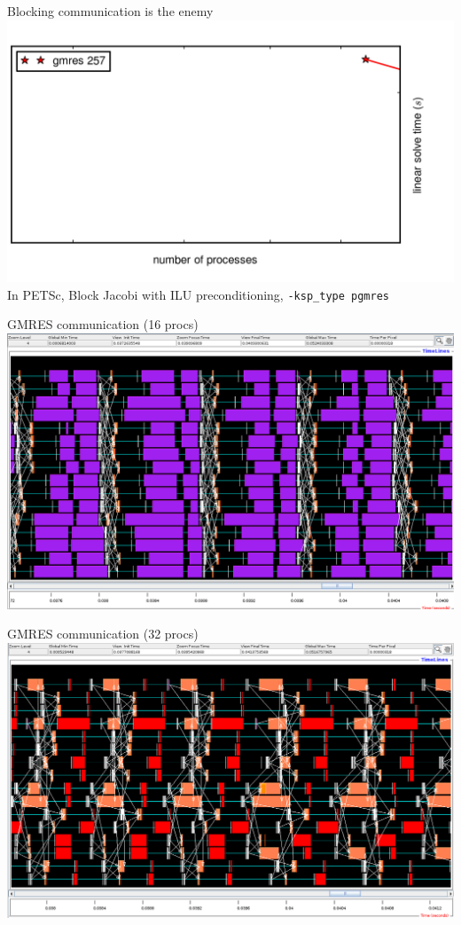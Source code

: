 \documentclass{beamer}
\begin{document}
\begin{frame}{Blocking communication is the enemy}
  \includegraphics{figures/PipelinedGMRES} \\
  In PETSc, Block Jacobi with ILU preconditioning, {\tt -ksp\_type pgmres}
\end{frame}
\begin{frame}{GMRES communication (16 procs)}
  \includegraphics[width=\textwidth]{figures/GMRESJumpshot}
\end{frame}
\begin{frame}{GMRES communication (32 procs)}
  \includegraphics[width=\textwidth]{figures/PGMRESJumpshot}
\end{frame}
\end{document}
